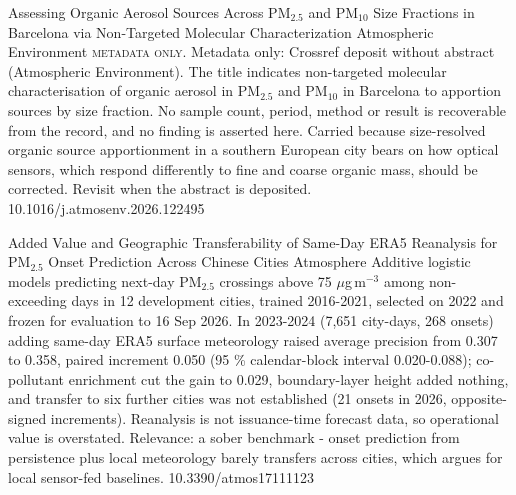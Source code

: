 \documentclass[10pt]{article}
\begin{document}
{Assessing Organic Aerosol Sources Across PM$_{2.5}$ and PM$_{10}$ Size Fractions in Barcelona via Non-Targeted Molecular Characterization}
{Atmospheric Environment}
{\textsc{metadata only.} Metadata only: Crossref deposit without abstract (Atmospheric Environment). The title indicates non-targeted molecular characterisation of organic aerosol in PM$_{2.5}$ and PM$_{10}$ in Barcelona to apportion sources by size fraction. No sample count, period, method or result is recoverable from the record, and no finding is asserted here. Carried because size-resolved organic source apportionment in a southern European city bears on how optical sensors, which respond differently to fine and coarse organic mass, should be corrected. Revisit when the abstract is deposited.}
{10.1016/j.atmosenv.2026.122495}

\par{}\baselineskip{}\baselineskip
{}

{Added Value and Geographic Transferability of Same-Day ERA5 Reanalysis for PM$_{2.5}$ Onset Prediction Across Chinese Cities}
{Atmosphere}
{Additive logistic models predicting next-day PM$_{2.5}$ crossings above 75 $\mu$g\,m$^{-3}$ among non-exceeding days in 12 development cities, trained 2016-2021, selected on 2022 and frozen for evaluation to 16 Sep 2026. In 2023-2024 (7,651 city-days, 268 onsets) adding same-day ERA5 surface meteorology raised average precision from 0.307 to 0.358, paired increment 0.050 (95 \% calendar-block interval 0.020-0.088); co-pollutant enrichment cut the gain to 0.029, boundary-layer height added nothing, and transfer to six further cities was not established (21 onsets in 2026, opposite-signed increments). Reanalysis is not issuance-time forecast data, so operational value is overstated. Relevance: a sober benchmark - onset prediction from persistence plus local meteorology barely transfers across cities, which argues for local sensor-fed baselines.}
{10.3390/atmos17111123}

\par{}\baselineskip{}\baselineskip
{}
\end{document}
